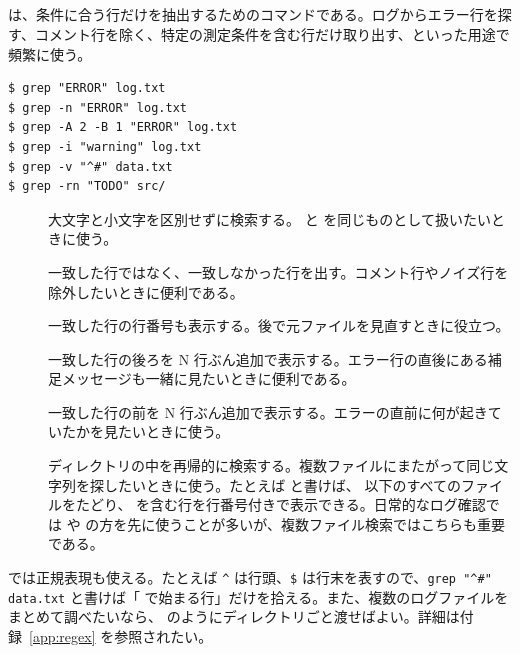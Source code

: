 \subsection{}

 は、条件に合う行だけを抽出するためのコマンドである。ログからエラー行を探す、コメント行を除く、特定の測定条件を含む行だけ取り出す、といった用途で頻繁に使う。

\begin{lstlisting}[numbers=none, xleftmargin=2\zw]
$ grep "ERROR" log.txt
$ grep -n "ERROR" log.txt
$ grep -A 2 -B 1 "ERROR" log.txt
$ grep -i "warning" log.txt
$ grep -v "^#" data.txt
$ grep -rn "TODO" src/
\end{lstlisting}

\begin{description}
\item[] 大文字と小文字を区別せずに検索する。 と  を同じものとして扱いたいときに使う。
\item[] 一致した行ではなく、一致しなかった行を出す。コメント行やノイズ行を除外したいときに便利である。
\item[] 一致した行の行番号も表示する。後で元ファイルを見直すときに役立つ。
\item[] 一致した行の後ろを N 行ぶん追加で表示する。エラー行の直後にある補足メッセージも一緒に見たいときに便利である。
\item[] 一致した行の前を N 行ぶん追加で表示する。エラーの直前に何が起きていたかを見たいときに使う。
\item[] ディレクトリの中を再帰的に検索する。複数ファイルにまたがって同じ文字列を探したいときに使う。たとえば  と書けば、 以下のすべてのファイルをたどり、 を含む行を行番号付きで表示できる。日常的なログ確認では  や  の方を先に使うことが多いが、複数ファイル検索ではこちらも重要である。
\end{description}

 では正規表現も使える。たとえば \verb|^| は行頭、\verb|$| は行末を表すので、\verb|grep "^#" data.txt| と書けば「\code{\#} で始まる行」だけを拾える。また、複数のログファイルをまとめて調べたいなら、 のようにディレクトリごと渡せばよい。詳細は付録~\ref{app:regex} を参照されたい。

\subsection{}

